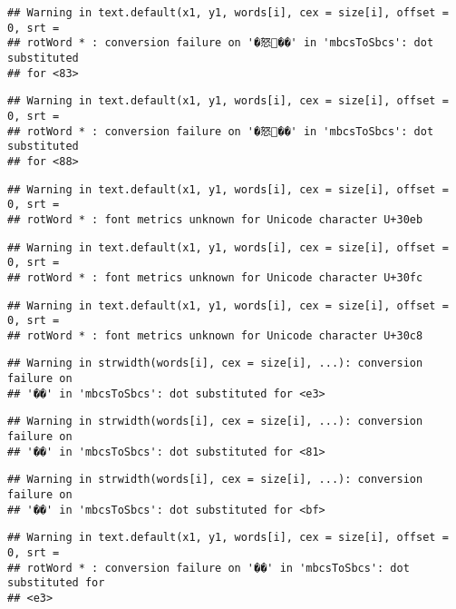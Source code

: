 \documentclass[]{article}
\begin{document}
\begin{verbatim}
## Warning in text.default(x1, y1, words[i], cex = size[i], offset = 0, srt =
## rotWord * : conversion failure on '�怒��' in 'mbcsToSbcs': dot substituted
## for <83>
\end{verbatim}

\begin{verbatim}
## Warning in text.default(x1, y1, words[i], cex = size[i], offset = 0, srt =
## rotWord * : conversion failure on '�怒��' in 'mbcsToSbcs': dot substituted
## for <88>
\end{verbatim}

\begin{verbatim}
## Warning in text.default(x1, y1, words[i], cex = size[i], offset = 0, srt =
## rotWord * : font metrics unknown for Unicode character U+30eb
\end{verbatim}

\begin{verbatim}
## Warning in text.default(x1, y1, words[i], cex = size[i], offset = 0, srt =
## rotWord * : font metrics unknown for Unicode character U+30fc
\end{verbatim}

\begin{verbatim}
## Warning in text.default(x1, y1, words[i], cex = size[i], offset = 0, srt =
## rotWord * : font metrics unknown for Unicode character U+30c8
\end{verbatim}

\begin{verbatim}
## Warning in strwidth(words[i], cex = size[i], ...): conversion failure on
## '��' in 'mbcsToSbcs': dot substituted for <e3>
\end{verbatim}

\begin{verbatim}
## Warning in strwidth(words[i], cex = size[i], ...): conversion failure on
## '��' in 'mbcsToSbcs': dot substituted for <81>
\end{verbatim}

\begin{verbatim}
## Warning in strwidth(words[i], cex = size[i], ...): conversion failure on
## '��' in 'mbcsToSbcs': dot substituted for <bf>
\end{verbatim}

\begin{verbatim}
## Warning in text.default(x1, y1, words[i], cex = size[i], offset = 0, srt =
## rotWord * : conversion failure on '��' in 'mbcsToSbcs': dot substituted for
## <e3>
\end{verbatim}
\end{document}
